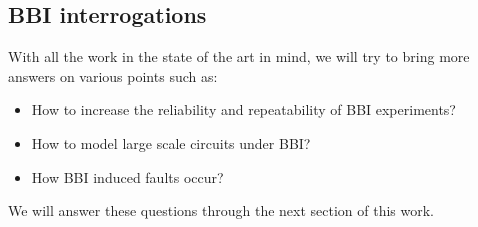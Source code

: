 	\subsection{BBI interrogations}
		With all the work in the state of the art in mind, we will try to bring more answers on various points such as:
		\begin{itemize}
			\item How to increase the reliability and repeatability of BBI experiments?
			\item How to model large scale circuits under BBI?
			\item How BBI induced faults occur?
		\end{itemize}
		We will answer these questions through the next section of this work.
